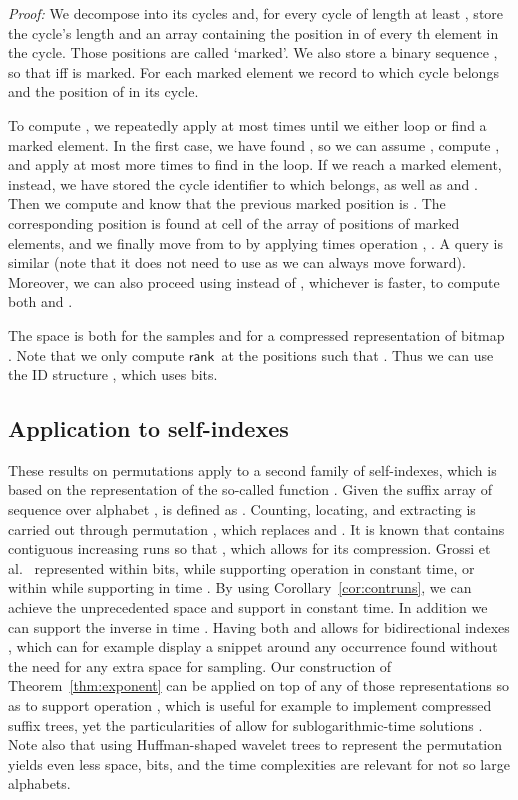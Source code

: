 \documentclass[11pt]{article}
\newenvironment{proof}{\textit{Proof:}}{\hfill \paragraph{} }
\newcommand{\rank}
    {\ensuremath{\mathsf{rank}}}
\begin{document}
\begin{table}[t]
{\begin{tabular}
\begin{proof}
We decompose  into its cycles and, for every cycle of length at least ,
store the cycle's length  and an array containing the position  in 
 of every th element in the cycle. Those positions  are called 
`marked'.  We also store a binary sequence , so that  iff  
is marked. For each marked element  we record to which cycle  belongs and 
the position  of  in its cycle.

To compute , we repeatedly apply  at most  times until 
we either loop or find a marked element. In the first case, we have found ,
so we can assume , compute , and apply  at most  
more times to find  in the loop. If we reach a 
marked element, instead, we have stored 
the cycle identifier to which  belongs, as well as  and . Then we 
compute  and know that the previous marked position is 
. The corresponding position  is found
at cell  of the array of positions of marked elements, and we finally
move from  to  by applying  times operation ,
.
A  query is similar (note that it does not need to use  as
we can always move forward). Moreover, we can also proceed using 
instead of , whichever is faster, to compute both  and 
.

The space is  both for the samples and for a compressed
representation of bitmap . Note that we only compute \rank\ at the
positions  such that . Thus we can use the ID structure 
\cite{RRR02}, which uses  bits.
\end{proof}

\subsection {Application to self-indexes}

These results on permutations apply to a second family of self-indexes, which
is based on the representation of the so-called  function 
\cite{GV05,GGV03,Sad03}. Given the suffix array  of sequence 
over alphabet ,  is defined as . Counting, locating, and extracting is carried
out through permutation , which replaces  and . It is known 
\cite{GV05} that  contains  contiguous increasing runs so that 
, which allows for its compression. Grossi et 
al.~\cite{GGV03} represented  within  bits,
while supporting operation  in constant time, or within  while supporting  in time . 
By using Corollary~\ref{cor:contruns}, we can achieve the
unprecedented space  and support  in
constant time. In addition we can support the inverse  in time 
. Having both  and  allows for
bidirectional indexes \cite{RNOM09}, which can for example display a snippet 
around any occurrence found without the need for any extra space for sampling. 
Our construction of 
Theorem~\ref{thm:exponent} can be applied on top of any of those 
representations so as to support operation , which is useful for
example to implement compressed suffix trees, yet the particularities of
 allow for sublogarithmic-time solutions \cite{GGV03}. Note also that
using Huffman-shaped wavelet trees to represent the permutation \cite{BN11} 
yields even less space,  bits, and the 
time complexities are relevant for not so large alphabets.


\end{tabular}}
\end{table}
\end{document}
